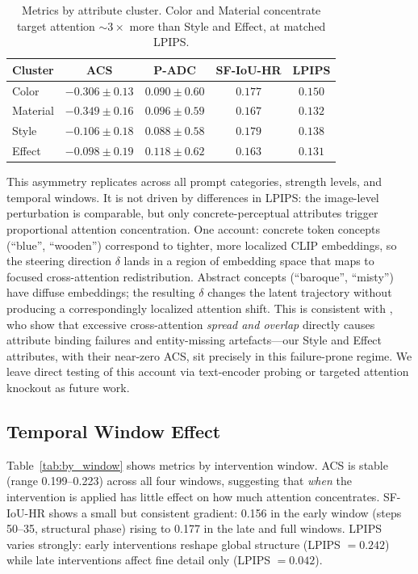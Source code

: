 \documentclass{article}
\begin{document}
\begin{table}[t]
\centering
\caption{Metrics by attribute cluster.  Color and Material
         concentrate target attention ${\sim}3\times$ more than
         Style and Effect, at matched LPIPS.}
\label{tab:by_cluster}
\vskip 0.05in
\setlength{\tabcolsep}{3.5pt}
\footnotesize
\begin{tabular}{@{}lcccc@{}}
\toprule
Cluster & ACS & P-ADC & SF-IoU-HR & LPIPS \\
\midrule
Color    & $-0.306 \pm 0.13$ & $0.090 \pm 0.60$ & $0.177$ & $0.150$ \\
Material & $-0.349 \pm 0.16$ & $0.096 \pm 0.59$ & $0.167$ & $0.132$ \\
Style    & $-0.106 \pm 0.18$ & $0.088 \pm 0.58$ & $0.179$ & $0.138$ \\
Effect   & $-0.098 \pm 0.19$ & $0.118 \pm 0.62$ & $0.163$ & $0.131$ \\
\bottomrule
\end{tabular}
\end{table}

This asymmetry replicates across all prompt categories, strength
levels, and temporal windows.  It is not driven by differences in
LPIPS: the image-level perturbation is comparable, but only
concrete-perceptual attributes trigger proportional attention
concentration.  One account: concrete token concepts (``blue'',
``wooden'') correspond to tighter, more localized CLIP embeddings,
so the steering direction $\delta$ lands in a region of embedding
space that maps to focused cross-attention redistribution.  Abstract
concepts (``baroque'', ``misty'') have diffuse embeddings; the
resulting $\delta$ changes the latent trajectory without producing
a correspondingly localized attention shift.  This is consistent
with \citet{wang2025attnoverlap}, who show that excessive
cross-attention \emph{spread and overlap} directly causes attribute
binding failures and entity-missing artefacts---our Style and Effect
attributes, with their near-zero ACS, sit precisely in this
failure-prone regime.  We leave direct testing of this account
via text-encoder probing or targeted attention knockout as future work.

\subsection{Temporal Window Effect}

Table~\ref{tab:by_window} shows metrics by intervention window.
ACS is stable (range 0.199--0.223) across all four windows,
suggesting that \emph{when} the intervention is applied has little
effect on how much attention concentrates.  SF-IoU-HR shows a small
but consistent gradient: 0.156 in the early window (steps 50--35,
structural phase) rising to 0.177 in the late and full windows.
LPIPS varies strongly: early interventions reshape global structure
(LPIPS $=0.242$) while late interventions affect fine detail only
(LPIPS $=0.042$).
\end{document}
